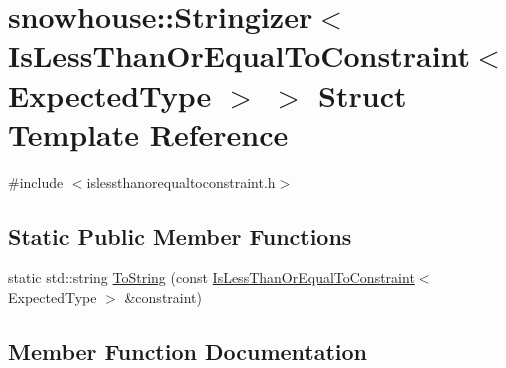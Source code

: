 \hypertarget{structsnowhouse_1_1Stringizer_3_01IsLessThanOrEqualToConstraint_3_01ExpectedType_01_4_01_4}{}\section{snowhouse\+::Stringizer$<$ Is\+Less\+Than\+Or\+Equal\+To\+Constraint$<$ Expected\+Type $>$ $>$ Struct Template Reference}
\label{structsnowhouse_1_1Stringizer_3_01IsLessThanOrEqualToConstraint_3_01ExpectedType_01_4_01_4}


{\ttfamily \#include $<$islessthanorequaltoconstraint.\+h$>$}

\subsection*{Static Public Member Functions}
\begin{DoxyCompactItemize}
\item 
static std\+::string \mbox{\hyperlink{structsnowhouse_1_1Stringizer_3_01IsLessThanOrEqualToConstraint_3_01ExpectedType_01_4_01_4_a6d57d93c5e669c07c778c329669283cd}{To\+String}} (const \mbox{\hyperlink{structsnowhouse_1_1IsLessThanOrEqualToConstraint}{Is\+Less\+Than\+Or\+Equal\+To\+Constraint}}$<$ Expected\+Type $>$ \&constraint)
\end{DoxyCompactItemize}


\subsection{Member Function Documentation}
\mbox{\label{structsnowhouse_1_1Stringizer_3_01IsLessThanOrEqualToConstraint_3_01ExpectedType_01_4_01_4_a6d57d93c5e669c07c778c329669283cd}} 
